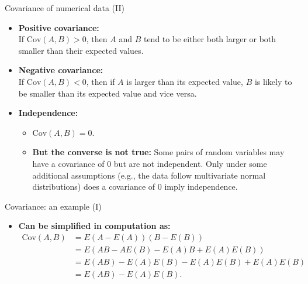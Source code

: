 \documentclass[aspectratio=169,t]{beamer}
\begin{document}
  { 
    \begin{frame}{Covariance of numerical data (II)}
    \begin{itemize}
      \item \textbf{Positive covariance:}\\
            If $\text{Cov}(A,B) > 0$, then $A$ and $B$ tend to be either both larger or both smaller than their expected values.
      \item \textbf{Negative covariance:}\\
            If $\text{Cov}(A,B) < 0$, then if $A$ is larger than its expected value, $B$ is likely to be smaller than its expected value and vice versa.
      \item \textbf{Independence:}
      \begin{itemize}
        \item $\text{Cov}(A,B) = 0$.
        \item \textbf{\color{airforceblue}But the converse is not true:} Some pairs of random variables may have a covariance of $0$ but are not independent. Only under some additional assumptions (e.g., the data follow multivariate normal distributions) does a covariance of $0$ imply independence.
      \end{itemize}
    \end{itemize}
    \end{frame}
  }

  { 
    \begin{frame}{Covariance: an example (I)}
    \begin{itemize}
      \item \textbf{Can be simplified in computation as:}
            \begin{align}
              \text{Cov}(A,B) &= E(A - E(A))(B-E(B))\\
                              &= E(AB-AE(B)-E(A)B+E(A)E(B))\\
                              &= E(AB)-E(A)E(B)-E(A)E(B)+E(A)E(B)\\
                              &= E(AB)-E(A)E(B).
            \end{align}
    \end{itemize}
    \end{frame}
  }
\end{document}
